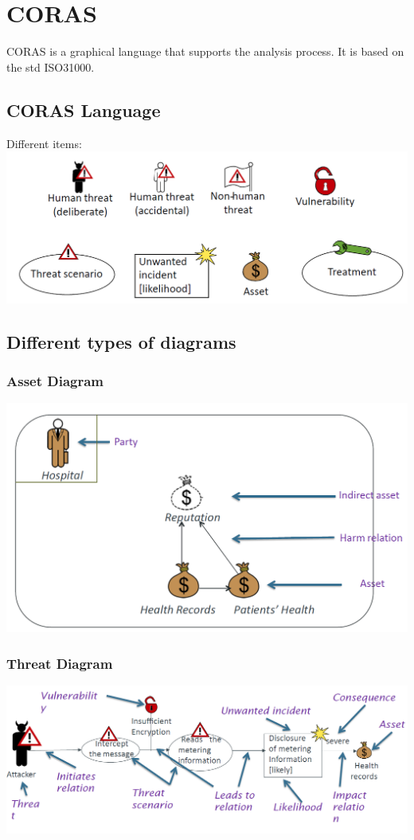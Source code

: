 \documentclass[10pt,a4paper,final]{report}
\begin{document}
\section{CORAS}
CORAS is a graphical language that supports the analysis process. It is based on the std ISO31000.
\subsection{CORAS Language}
Different items: \\
\includegraphics[scale=.4]{CORASItems.png}\\
\subsection{Different types of diagrams}
\subsubsection{Asset Diagram}
\includegraphics[scale=.4]{AssetDiagram.png}
\subsubsection{Threat Diagram}
\includegraphics[scale=.4]{ThreatDiagram.png}
\end{document}
